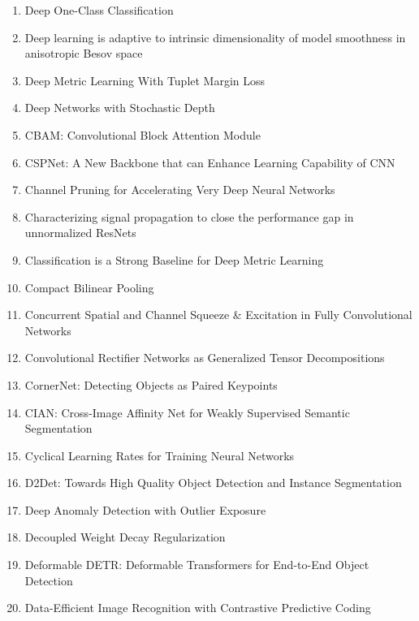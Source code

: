\documentclass[acmlarge]{acmart}
\begin{document}
\begin{enumerate}
	\item Deep One-Class Classification \cite{Ruff2018DeepOC}
	\item Deep learning is adaptive to intrinsic dimensionality of model smoothness in anisotropic Besov space \cite{Suzuki2019DeepLI}
	\item Deep Metric Learning With Tuplet Margin Loss \cite{Yu2019DeepML}
	\item Deep Networks with Stochastic Depth \cite{Huang2016DeepNW}
	\item CBAM: Convolutional Block Attention Module \cite{Woo2018CBAMCB}
	\item CSPNet: A New Backbone that can Enhance Learning Capability of CNN \cite{Wang2020CSPNetAN}
	\item Channel Pruning for Accelerating Very Deep Neural Networks \cite{He2017ChannelPF}
	\item Characterizing signal propagation to close the performance gap in unnormalized ResNets \cite{Brock2021CharacterizingSP}
	\item Classification is a Strong Baseline for Deep Metric Learning \cite{Zhai2019ClassificationIA}
	\item Compact Bilinear Pooling \cite{Gao2016CompactBP}
	\item Concurrent Spatial and Channel Squeeze \& Excitation in Fully Convolutional Networks \cite{Roy2018ConcurrentSA}
	\item Convolutional Rectifier Networks as Generalized Tensor Decompositions \cite{Cohen2016ConvolutionalRN}
	\item CornerNet: Detecting Objects as Paired Keypoints \cite{Law2018CornerNetDO}
	\item CIAN: Cross-Image Affinity Net for Weakly Supervised Semantic Segmentation \cite{Fan2020CIANCA}
	\item Cyclical Learning Rates for Training Neural Networks \cite{Smith2017CyclicalLR}
	\item D2Det: Towards High Quality Object Detection and Instance Segmentation \cite{Cao2020D2DetTH}
	\item Deep Anomaly Detection with Outlier Exposure \cite{Hendrycks2019DeepAD}
	\item Decoupled Weight Decay Regularization \cite{Loshchilov2019DecoupledWD}
	\item Deformable DETR: Deformable Transformers for End-to-End Object Detection \cite{Zhu2021DeformableDD}
	\item Data-Efficient Image Recognition with Contrastive Predictive Coding \cite{Hnaff2020DataEfficientIR}

\end{enumerate}
\end{document}
